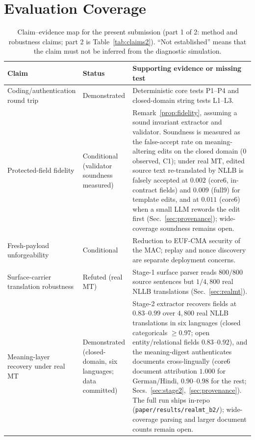 \documentclass[journal]{IEEEtran}
\begin{document}
\section{Evaluation Coverage}

\begin{table}[t]
\centering
\small
\caption{Claim--evidence map for the present submission (part 1 of 2: method
and robustness claims; part 2 is Table~\ref{tab:claims2}). ``Not established''
means that the claim must not be inferred from the diagnostic simulation.}
\label{tab:claims}
\begin{tabularx}{\textwidth}{@{}>{\raggedright\arraybackslash}p{3.1cm}>{\raggedright\arraybackslash}p{3.0cm}X@{}}
\toprule
Claim & Status & Supporting evidence or missing test \\
\midrule
Coding/\allowbreak authentication round trip & Demonstrated & Deterministic core tests P1--P4 and closed-domain string tests L1--L3. \\
Protected-field fidelity & Conditional (validator soundness measured) & Remark~\ref{prop:fidelity}, assuming a sound invariant extractor and validator. Soundness is measured as the false-accept rate on meaning-altering edits on the closed domain ($0$ observed, C1); under real MT, edited source text re-translated by NLLB is falsely accepted at $0.002$ (core6, in-contract fields) and $0.009$ (full9) for template edits, and at $0.011$ (core6) when a small LLM rewords the edit first (Sec.~\ref{sec:provenance}); wide-coverage soundness remains open. \\
Fresh-payload unforgeability & Conditional & Reduction to EUF-CMA security of the MAC; replay and nonce discovery are separate deployment concerns. \\
Surface-carrier translation robustness & Refuted (real MT) & Stage-1 surface parser reads $800/800$ source sentences but $1/4{,}800$ real NLLB translations (Sec.~\ref{sec:realmt}). \\
Meaning-layer recovery under real MT & Demonstrated (closed-domain, six languages; data committed) & Stage-2 extractor recovers fields at $0.83$--$0.99$ over $4{,}800$ real NLLB translations in six languages (closed categoricals $\ge0.97$; open entity/relational fields $0.83$--$0.92$), and the meaning-digest authenticates documents cross-lingually (core6 document attribution $1.000$ for German/Hindi, $0.90$--$0.98$ for the rest; Secs.~\ref{sec:stage2},~\ref{sec:provenance}). The full run ships in-repo (\texttt{paper/results/realmt\_b2/}); wide-coverage parsing and larger document counts remain open. \\

\end{tabularx}
\end{table}
\end{document}
